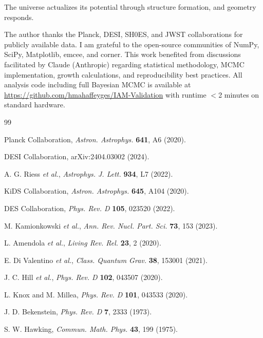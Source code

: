 \documentclass[twocolumn,superscriptaddress,prl,amsmath,amssymb]{revtex4-2}
\begin{document}
The universe actualizes its potential through structure formation, and geometry responds.

\begin{acknowledgments}
The author thanks the Planck, DESI, SH0ES, and JWST collaborations for publicly available data. I am grateful to the open-source communities of NumPy, SciPy, Matplotlib, emcee, and corner. This work benefited from discussions facilitated by Claude (Anthropic) regarding statistical methodology, MCMC implementation, growth calculations, and reproducibility best practices. All analysis code including full Bayesian MCMC is available at \url{https://github.com/hmahaffeyges/IAM-Validation} with runtime $<$2 minutes on standard hardware.
\end{acknowledgments}

\begin{thebibliography}{99}

Planck Collaboration,
\textit{Astron. Astrophys.} \textbf{641}, A6 (2020).

DESI Collaboration,
arXiv:2404.03002 (2024).

A. G. Riess \textit{et al.},
\textit{Astrophys. J. Lett.} \textbf{934}, L7 (2022).

KiDS Collaboration,
\textit{Astron. Astrophys.} \textbf{645}, A104 (2020).

DES Collaboration,
\textit{Phys. Rev. D} \textbf{105}, 023520 (2022).

M. Kamionkowski \textit{et al.},
\textit{Ann. Rev. Nucl. Part. Sci.} \textbf{73}, 153 (2023).

L. Amendola \textit{et al.},
\textit{Living Rev. Rel.} \textbf{23}, 2 (2020).

E. Di Valentino \textit{et al.},
\textit{Class. Quantum Grav.} \textbf{38}, 153001 (2021).

J. C. Hill \textit{et al.},
\textit{Phys. Rev. D} \textbf{102}, 043507 (2020).

L. Knox and M. Millea,
\textit{Phys. Rev. D} \textbf{101}, 043533 (2020).

J. D. Bekenstein,
\textit{Phys. Rev. D} \textbf{7}, 2333 (1973).

S. W. Hawking,
\textit{Commun. Math. Phys.} \textbf{43}, 199 (1975).


\end{thebibliography}
\end{document}
